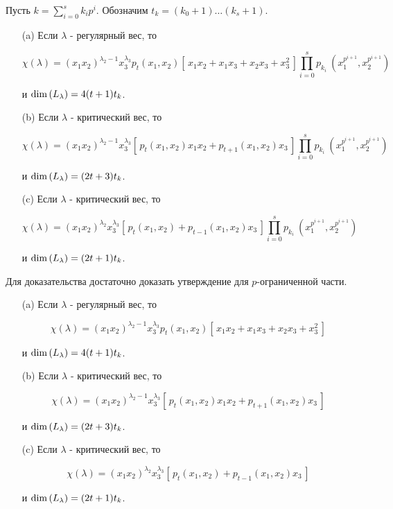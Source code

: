 \begin{proposition} Пусть $ k = \sum\limits_{i = 0}^{s} k_i p^i $. Обозначим $ t_k = (k_0 + 1) \ldots (k_s + 1) $.
\begin{enumerate}
\item [\textup{(a)}] Если $\lambda$ - регулярный вес, то 

$$ \chi(\lambda) = (x_1 x_2)^{\lambda_2 - 1} x_3^{\lambda_3} p_t (x_1, x_2) [\,x_1 x_2 + x_1 x_3 + x_2 x_3 + x_3^2\,] 
\prod\limits_{i = 0}^{s}p_{k_i} ~(x_1^{p^{i + 1}}, x_2^{p^{i + 1}})
$$

и $ \mbox{\textup{dim}}\,(L_{\lambda}) = 4 (t + 1) t_k $.

\item [\textup{(b)}] Если $\lambda$ - критический вес, то

$$ \chi(\lambda) = (x_1 x_2)^{\lambda_2 - 1} x_3^{\lambda_3} [\,p_t (x_1, x_2) x_1 x_2 + p_{t + 1} (x_1, x_2) x_3\,] 
\prod\limits_{i = 0}^{s}p_{k_i} ~(x_1^{p^{i + 1}}, x_2^{p^{i + 1}}) 
$$

и $\mbox{\textup{dim}}\,(L_{\lambda}) = (2 t + 3) t_k $.
\item [\textup{(c)}] Если $\lambda$ - критический вес, то

$$ \chi(\lambda) = (x_1 x_2)^{\lambda_2} x_3^{\lambda_3} [\,p_t (x_1, x_2) + p_{t - 1} (x_1, x_2) x_3 \,] 
\prod\limits_{i = 0}^{s}p_{k_i} ~(x_1^{p^{i + 1}}, x_2^{p^{i + 1}})
$$

и $\mbox{\textup{dim}}\,(L_{\lambda}) = (2 t + 1) t_k $.
\end{enumerate}
\end{proposition}

Для доказательства достаточно доказать утверждение для $p$-ограниченной части.
\begin{lemma} 
\begin{enumerate} Пусть $ \lambda = (t + \lambda_2, \lambda_2 \,|\, \lambda_3), \quad 0 \leq t < p $.
\item [\textup{(a)}] Если $\lambda$ - регулярный вес, то 

$$ \chi(\lambda) = (x_1 x_2)^{\lambda_2 - 1} x_3^{\lambda_3} p_t (x_1, x_2) [\,x_1 x_2 + x_1 x_3 + x_2 x_3 + x_3^2\,] $$

и $ \mbox{\textup{dim}}\,(L_{\lambda}) = 4 (t + 1) t_k $.

\item [\textup{(b)}] Если $\lambda$ - критический вес, то

$$ \chi(\lambda) = (x_1 x_2)^{\lambda_2 - 1} x_3^{\lambda_3} [\,p_t (x_1, x_2) x_1 x_2 + p_{t + 1} (x_1, x_2) x_3\,] $$

и $\mbox{\textup{dim}}\,(L_{\lambda}) = (2 t + 3) t_k $.
\item [\textup{(c)}] Если $\lambda$ - критический вес, то

$$ \chi(\lambda) = (x_1 x_2)^{\lambda_2} x_3^{\lambda_3} [\,p_t (x_1, x_2) + p_{t - 1} (x_1, x_2) x_3 \,] $$

и $\mbox{\textup{dim}}\,(L_{\lambda}) = (2 t + 1) t_k $.
\end{enumerate}
\end{lemma}


